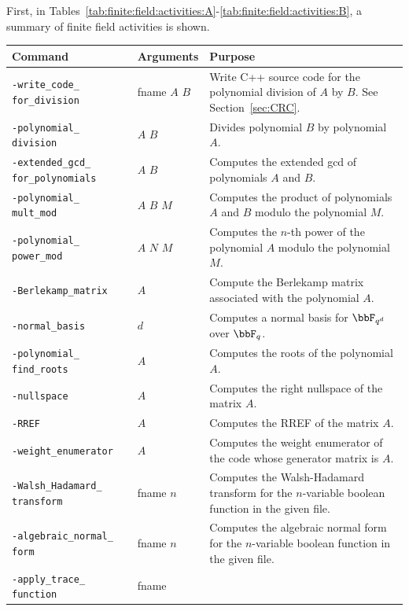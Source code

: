 First, in Tables~\ref{tab:finite:field:activities:A}-\ref{tab:finite:field:activities:B},  a summary of 
finite field activities is shown.
\begin{table}
	\begin{center}
	\begin{tabular}{|p{4cm}|p{3cm}|p{7cm}|}
		\hline
		Command & Arguments & Purpose \\
		\hline
		\hline
		\verb'-write_code_' \verb'for_division' &  fname $A$ $B$ &  Write C++ source code for the polynomial division of $A$ by $B$. See Section~\ref{sec:CRC}.  \\
		\hline
		\verb'-polynomial_' \verb'division' &  $A$ $B$  &  Divides polynomial $B$ by polynomial $A$.  \\
		\hline
		\verb'-extended_gcd_' \verb'for_polynomials' &  $A$ $B$ &  Computes the extended gcd of polynomials $A$ and $B$.  \\
		\hline
		\verb'-polynomial_' \verb'mult_mod' &   $A$ $B$ $M$ &  Computes the product of polynomials $A$ and $B$ modulo the polynomial $M$.  \\
		\hline
		\verb'-polynomial_' \verb'power_mod' &   $A$ $N$ $M$ &  Computes the $n$-th power of the polynomial $A$ modulo the polynomial $M$.  \\
		\hline
		\verb'-Berlekamp_matrix' &  $A$ &  Compute the Berlekamp matrix associated with the polynomial $A$.  \\
		\hline
		\verb'-normal_basis' & $d$  &  Computes a normal basis for $\bbF_{q^d}$ over $\bbF_q$.  \\
		\hline
		\verb'-polynomial_' \verb'find_roots' & $A$  &  Computes the roots of the polynomial $A$.  \\
		\hline
		\verb'-nullspace' & $A$  &  Computes the right nullspace of the matrix $A$.  \\
		\hline
		\verb'-RREF' &  $A$ &  Computes the RREF of the matrix $A$.  \\
		\hline
		\verb'-weight_enumerator' & $A$  &  
		Computes the weight enumerator of the code whose generator matrix is $A$.  \\
		\hline
		\verb'-Walsh_Hadamard_' \verb'transform' & fname $n$  &  
		Computes the Walsh-Hadamard transform for the $n$-variable boolean function in the given file. \\
		\hline
		\verb'-algebraic_normal_' \verb'form' & fname $n$  &  
		Computes the algebraic normal form for the $n$-variable boolean function in the given file. \\
		\hline
		\verb'-apply_trace_' \verb'function' & fname   &  

\end{tabular}
\end{center}
\end{table}
